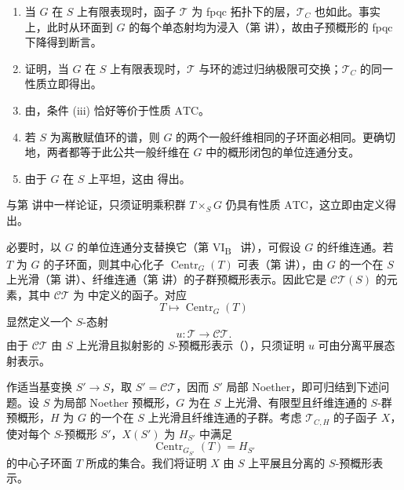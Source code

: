 \begin{enumerate}
\renewcommand{\labelenumi}{\textup{\roman{enumi})}}
\item 当 \(G\) 在 \(S\) 上有限表现时，函子 \(\mathcal T\) 为 fpqc 拓扑下的层，\(\mathcal T_C\) 也如此。事实上，此时从环面到 \(G\) 的每个单态射均为浸入（第  讲），故由子预概形的 fpqc 下降得到断言。

\item {} 证明，当 \(G\) 在 \(S\) 上有限表现时，\(\mathcal T\) 与环的滤过归纳极限可交换；\(\mathcal T_C\) 的同一性质立即得出。

\item 由，条件 \textup{(iii)} 恰好等价于性质 \(\mathrm{ATC}\)。

\item 若 \(S\) 为离散赋值环的谱，则 \(G\) 的两个一般纤维相同的子环面必相同。更确切地，两者都等于此公共一般纤维在 \(G\) 中的概形闭包的单位连通分支。

\item 由于 \(G\) 在 \(S\) 上平坦，这由 得出。
\end{enumerate}

与第  讲中一样论证，只须证明乘积群 \(T\times_S G\) 仍具有性质 \(\mathrm{ATC}\)，这立即由定义得出。

必要时，以 \(G\) 的单位连通分支替换它（第 VI\textsubscript{B}~ 讲），可假设 \(G\) 的纤维连通。若 \(T\) 为 \(G\) 的子环面，则其中心化子 \(\operatorname{Centr}_G(T)\) 可表（第  讲），由 \(G\) 的一个在 \(S\) 上光滑（第  讲）、纤维连通（第  讲）的子群预概形表示。因此它是 \(\mathcal{CT}(S)\) 的元素，其中 \(\mathcal{CT}\) 为  中定义的函子。对应
\[
  T\longmapsto\operatorname{Centr}_G(T)
\]
显然定义一个 \(S\)-态射
\[
  u:\mathcal T\longrightarrow\mathcal{CT}.
\]
由于 \(\mathcal{CT}\) 由 \(S\) 上光滑且拟射影的 \(S\)-预概形表示（），只须证明 \(u\) 可由分离平展态射表示。

作适当基变换 \(S'\to S\)，取 \(S'=\mathcal{CT}\)，因而 \(S'\) 局部 Noether，即可归结到下述问题。设 \(S\) 为局部 Noether 预概形，\(G\) 为在 \(S\) 上光滑、有限型且纤维连通的 \(S\)-群预概形，\(H\) 为 \(G\) 的一个在 \(S\) 上光滑且纤维连通的子群。考虑 \(\mathcal T_{C,H}\) 的子函子 \(X\)，使对每个 \(S\)-预概形 \(S'\)，\(X(S')\) 为 \(H_{S'}\) 中满足
\[
  \operatorname{Centr}_{G_{S'}}(T)=H_{S'}
\]
的中心子环面 \(T\) 所成的集合。我们将证明 \(X\) 由 \(S\) 上平展且分离的 \(S\)-预概形表示。

